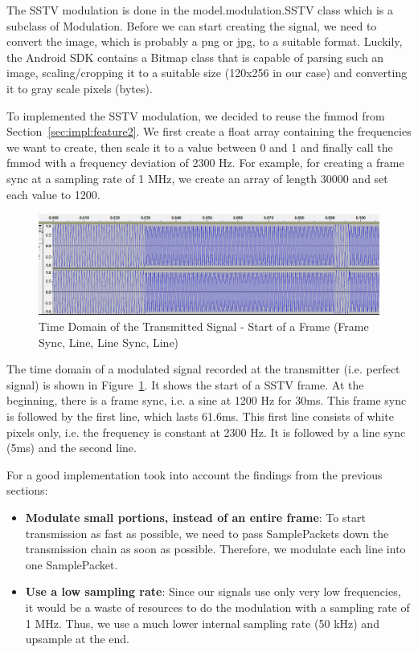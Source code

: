 The SSTV modulation is done in the model.modulation.SSTV class which is a subclass of Modulation. Before we can start creating the signal, we need to convert the image, which is probably a png or jpg, to a suitable format. Luckily, the Android SDK contains a Bitmap class that is capable of parsing such an image, scaling/cropping it to a suitable size (120x256 in our case) and converting it to gray scale pixels (bytes). 

To implemented the SSTV modulation, we decided to reuse the fmmod from Section~\ref{sec:impl:feature2}. We first create a float array containing the frequencies we want to create, then scale it to a value between 0 and 1 and finally call the fmmod with a frequency deviation of 2300 Hz. For example, for creating a frame sync at a sampling rate of 1 MHz, we create an array of length 30000 and set each value to 1200. 

\begin{figure}[!htbp]
	\centering
	\includegraphics[width=1.0\linewidth]{gfx/sstv_timedomain.png}
	\caption{Time Domain of the Transmitted Signal - Start of a Frame (Frame Sync, Line, Line  Sync, Line) }
	\label{fig:impl:sstv:sstvtime}
\end{figure}


The time domain of a modulated signal recorded at the transmitter (i.e. perfect signal) is shown in Figure~\ref{fig:impl:sstv:sstvtime}. It shows the start of a \ac{SSTV} frame. At the beginning, there is a frame sync, i.e. a sine at 1200 Hz for 30ms. This frame sync is followed by the first line, which lasts 61.6ms. This first line consists of white pixels only, i.e. the frequency is constant at 2300 Hz. It is followed by a line sync (5ms) and the second line. 

For a good implementation took into account the findings from the previous sections:
\begin{itemize}
	\item \textbf{Modulate small portions, instead of an entire frame}: To start transmission as fast as possible, we need to pass SamplePackets down the transmission chain as soon as possible. Therefore, we modulate each line into one SamplePacket. 
	\item \textbf{Use a low sampling rate}: Since our signals use only very low frequencies, it would be a waste of resources to do the modulation with a sampling rate of 1 MHz. Thus, we use a much lower internal sampling rate (50 kHz) and upsample at the end.
\end{itemize}



